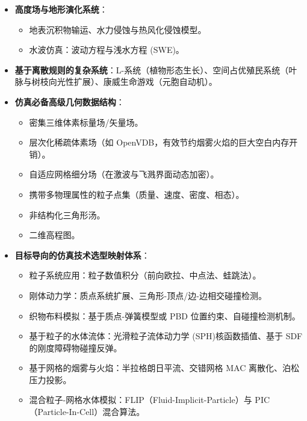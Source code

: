 \begin{itemize}
\begin{itemize}
        \item 半拉格朗日平流算法（无条件稳定的一阶回溯插值）。
        \item 亥姆霍兹-霍奇分解与泊松压力投影方程求解器（保持速度场无散度 $\nabla \cdot \mathbf{u} = 0$）。
    \end{itemize}
    \item \textbf{高度场与地形演化系统}：
    \begin{itemize}
        \item 地表沉积物输运、水力侵蚀与热风化侵蚀模型。
        \item 水波仿真：波动方程与浅水方程 (SWE)。
    \end{itemize}
    \item \textbf{基于离散规则的复杂系统}：L-系统（植物形态生长）、空间占优殖民系统（叶脉与树枝向光性扩展）、康威生命游戏（元胞自动机）。
    \item \textbf{仿真必备高级几何数据结构}：
    \begin{itemize}
        \item 密集三维体素标量场/矢量场。
        \item 层次化稀疏体素场（如 OpenVDB，有效节约烟雾火焰的巨大空白内存开销）。
        \item 自适应网格细分场（在激波与飞溅界面动态加密）。
        \item 携带多物理属性的粒子点集（质量、速度、密度、相态）。
        \item 非结构化三角形汤。
        \item 二维高程图。
    \end{itemize}
    \item \textbf{目标导向的仿真技术选型映射体系}：
    \begin{itemize}
        \item 粒子系统应用：粒子数值积分（前向欧拉、中点法、蛙跳法）。
        \item 刚体动力学：质点系统扩展、三角形-顶点/边-边相交碰撞检测。
        \item 织物布料模拟：基于质点-弹簧模型或 PBD 位置约束、自碰撞检测机制。
        \item 基于粒子的水体流体：光滑粒子流体动力学 (SPH)核函数插值、基于 SDF 的刚度障碍物碰撞反弹。
        \item 基于网格的烟雾与火焰：半拉格朗日平流、交错网格 MAC 离散化、泊松压力投影。
        \item 混合粒子-网格水体模拟：FLIP（Fluid-Implicit-Particle）与 PIC（Particle-In-Cell）混合算法。
    \end{itemize}
\end{itemize}

